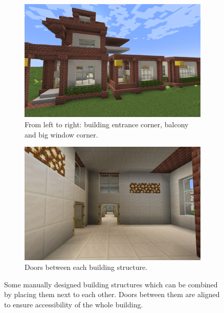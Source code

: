 \documentclass[
oneside,
fontsize=11pt
]{scrartcl}
\begin{document}
\begin{figure}[ht]
  \centering
  \begin{subfigure}[t]{0.48\textwidth}
    \includegraphics[width=\textwidth]{images/structures/building-structures-close-up.png}
    \caption{From left to right: building entrance corner, balcony and big window corner.}
    \label{fig_building_structures_close_up}
  \end{subfigure}
  \hfill
  \begin{subfigure}[t]{0.48\textwidth}
      \includegraphics[width=\textwidth]{images/structures/building-structures-doors.png}
      \caption{Doors between each building structure.}
  \end{subfigure}
  \caption{Some manually designed building structures 
    which can be combined by placing them next to each other. 
    Doors between them are aligned to ensure accessibility of the whole building.}
  \label{fig_building_structures}
\end{figure}
\end{document}
